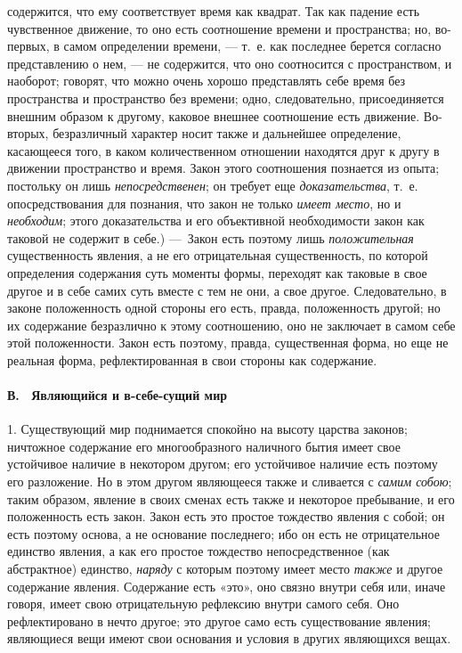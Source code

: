содержится, что ему соответствует время как квадрат. Так как падение есть
чувственное движение, то оно есть соотношение времени и пространства; но,
во-первых, в самом определении времени, — т.~е. как последнее берется
согласно представлению о нем, — не содержится, что оно соотносится с
пространством, и наоборот; говорят, что можно очень хорошо представлять
себе время без пространства и пространство без времени; одно,
следовательно, присоединяется внешним образом к другому, каковое внешнее
соотношение есть движение. Во-вторых, безразличный характер носит также и
дальнейшее определение, касающееся того, в каком количественном отношении
находятся друг к другу в движении пространство и время. Закон этого
соотношения познается из опыта; постольку он лишь
{\em непосредственен}; он требует еще
{\em доказательства}, т.~е. опосредствования для
познания, что закон не только {\em имеет место}, но и
{\em необходим}; этого доказательства и его объективной
необходимости закон как таковой не содержит в себе.) —~Закон есть поэтому
лишь {\em положительная} существенность явления, а не
его отрицательная существенность, по которой определения содержания суть
моменты формы, переходят как таковые в свое другое и в себе самих суть
вместе с тем не они, а свое другое. Следовательно, в законе положенность
одной стороны его есть, правда, положенность другой; но их содержание
безразлично к этому соотношению, оно не заключает в самом себе этой
положенности. Закон есть поэтому, правда, существенная форма, но еще не
реальная форма, рефлектированная в свои стороны как содержание.

\paragraph[В. \ Являющийся и в{}-себе{}-сущий мир]{В. \ Являющийся и
в-себе-сущий мир}
\hypertarget{Toc478978747}{}1. Существующий мир поднимается спокойно на
высоту царства законов; ничтожное содержание его многообразного наличного
бытия имеет свое устойчивое наличие в некотором другом; его устойчивое
наличие есть поэтому его разложение. Но в этом другом являющееся также и
сливается с {\em самим собою}; таким образом, явление в
своих сменах есть также и некоторое пребывание, и его положенность есть
закон. Закон есть это простое тождество явления с собой; он есть поэтому
основа, а не основание последнего; ибо он есть не отрицательное единство
явления, а как его простое тождество непосредственное (как абстрактное)
единство, {\em наряду} с которым поэтому имеет место
{\em также} и другое содержание явления. Содержание
есть «это», оно связно внутри себя или, иначе говоря, имеет свою
отрицательную рефлексию внутри самого себя. Оно рефлектировано в нечто
другое; это другое само есть существование явления; являющиеся вещи имеют
свои основания и условия в других являющихся вещах.

